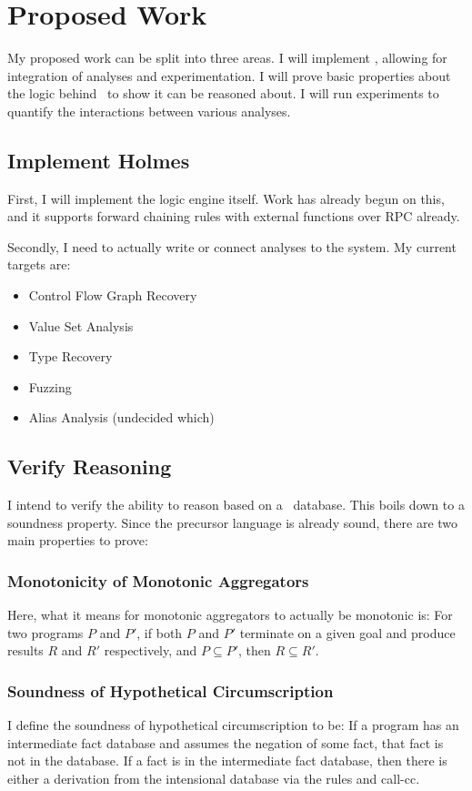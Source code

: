 \chapter{Proposed Work}
My proposed work can be split into three areas.
I will implement \sysname, allowing for integration of analyses and experimentation.
I will prove basic properties about the logic behind \sysname\ to show it can be reasoned about.
I will run experiments to quantify the interactions between various analyses.

\section{Implement Holmes}
First, I will implement the logic engine itself.
Work has already begun on this, and it supports forward chaining rules with external functions over RPC already.

Secondly, I need to actually write or connect analyses to the system.
My current targets are:
\begin{itemize}
        \item Control Flow Graph Recovery
        \item Value Set Analysis\cite{vsa}
        \item Type Recovery\cite{bitr}
        \item Fuzzing
        \item Alias Analysis (undecided which)
\end{itemize}

\section{Verify Reasoning}
I intend to verify the ability to reason based on a \sysname\ database.
This boils down to a soundness property.
Since the precursor language is already sound, there are two main properties to prove:
\subsection{Monotonicity of Monotonic Aggregators}
Here, what it means for monotonic aggregators to actually be monotonic is:
For two programs $P$ and $P'$, if both $P$ and $P'$ terminate on a given goal and produce results $R$ and $R'$ respectively, and $P \subseteq P'$, then $R \subseteq R'$.

\subsection{Soundness of Hypothetical Circumscription}
I define the soundness of hypothetical circumscription to be:
If a program has an intermediate fact database and assumes the negation of some fact, that fact is not in the database.
If a fact is in the intermediate fact database, then there is either a derivation from the intensional database via the rules and call-cc.

